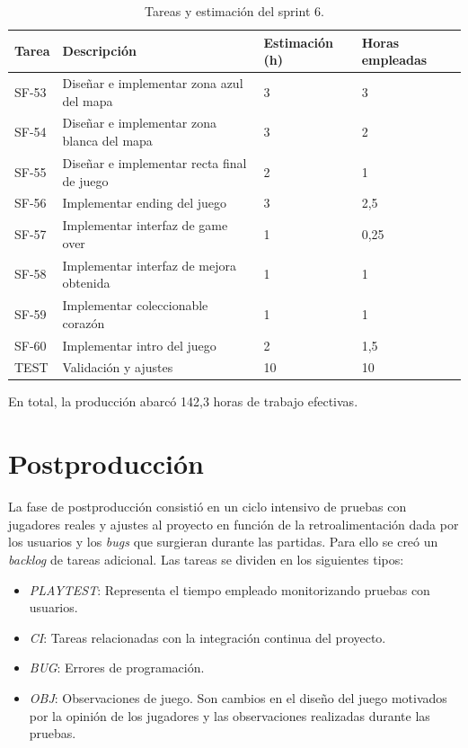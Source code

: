 \begin{table}[!ht]
    \centering
    \begin{tabular}{|l|p{8cm}|p{2cm}|p{2cm}|}
    \hline
        Tarea & Descripción & Estimación (h) & Horas empleadas \\ \hline
        SF-53 & Diseñar e implementar zona azul del mapa & 3 & 3 \\ \hline
        SF-54 & Diseñar e implementar zona blanca del mapa & 3 & 2 \\ \hline
        SF-55 & Diseñar e implementar recta final de juego & 2 & 1 \\ \hline
        SF-56 & Implementar ending del juego & 3 & 2,5 \\ \hline
        SF-57 & Implementar interfaz de game over & 1 & 0,25 \\ \hline
        SF-58 & Implementar interfaz de mejora obtenida & 1 & 1 \\ \hline
        SF-59 & Implementar coleccionable corazón & 1 & 1 \\ \hline
        SF-60 & Implementar intro del juego & 2 & 1,5 \\ \hline
        TEST & Validación y ajustes & 10 & 10 \\ \hline
    \end{tabular}
    \caption{Tareas y estimación del sprint 6.}
    \label{tab:sprint6task}
\end{table}

En total, la producción abarcó 142,3 horas de trabajo efectivas.

\section{Postproducción}

La fase de postproducción consistió en un ciclo intensivo de pruebas con jugadores reales y ajustes al proyecto en función de la retroalimentación dada por los usuarios y los \textit{bugs} que surgieran durante las partidas. Para ello se creó un \textit{backlog} de tareas adicional. Las tareas se dividen en los siguientes tipos:

\begin{itemize}
    \item \textit{PLAYTEST}: Representa el tiempo empleado monitorizando pruebas con usuarios.
    \item \textit{CI}: Tareas relacionadas con la integración continua del proyecto.
    \item \textit{BUG}: Errores de programación.
    \item \textit{OBJ}: Observaciones de juego. Son cambios en el diseño del juego motivados por la opinión de los jugadores y las observaciones realizadas durante las pruebas.
\end{itemize}

